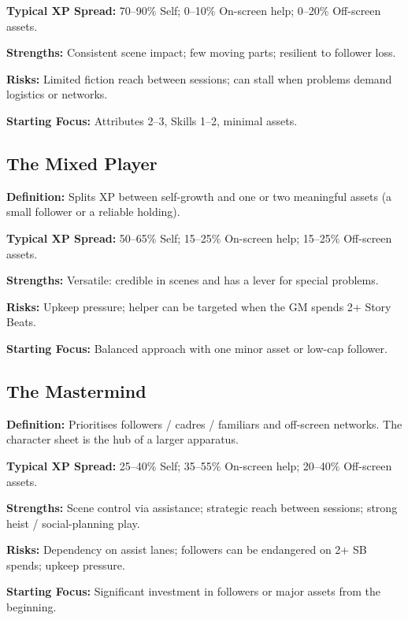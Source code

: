 \medskip
\noindent\textbf{Typical XP Spread:} 70--90\% Self; 0--10\% On-screen help; 0--20\% Off-screen assets.

\medskip
\noindent\textbf{Strengths:} Consistent scene impact; few moving parts; resilient to
follower loss.

\medskip
\noindent\textbf{Risks:} Limited fiction reach between sessions; can stall when
problems demand logistics or networks.

\medskip
\noindent\textbf{Starting Focus:} Attributes 2--3, Skills 1--2, minimal assets.

\subsection*{The Mixed Player}
\label{sec:archetype-mixed}

\textbf{Definition:} Splits XP between self-growth and one or two meaningful
assets (a small follower or a reliable holding).

\medskip
\noindent\textbf{Typical XP Spread:} 50--65\% Self; 15--25\% On-screen help; 15--25\% Off-screen assets.

\medskip
\noindent\textbf{Strengths:} Versatile: credible in scenes and has a lever for special
problems.

\medskip
\noindent\textbf{Risks:} Upkeep pressure; helper can be targeted when the GM spends 2+ Story Beats.

\medskip
\noindent\textbf{Starting Focus:} Balanced approach with one minor asset or low-cap follower.

\subsection*{The Mastermind}
\label{sec:archetype-mastermind}

\textbf{Definition:} Prioritises followers / cadres / familiars and off-screen
networks. The character sheet is the hub of a larger apparatus.

\medskip
\noindent\textbf{Typical XP Spread:} 25--40\% Self; 35--55\% On-screen help; 20--40\% Off-screen assets.

\medskip
\noindent\textbf{Strengths:} Scene control via assistance; strategic reach between
sessions; strong heist / social-planning play.

\medskip
\noindent\textbf{Risks:} Dependency on assist lanes; followers can be endangered on 2+ SB
spends; upkeep pressure.

\medskip
\noindent\textbf{Starting Focus:} Significant investment in followers or major assets
from the beginning.

